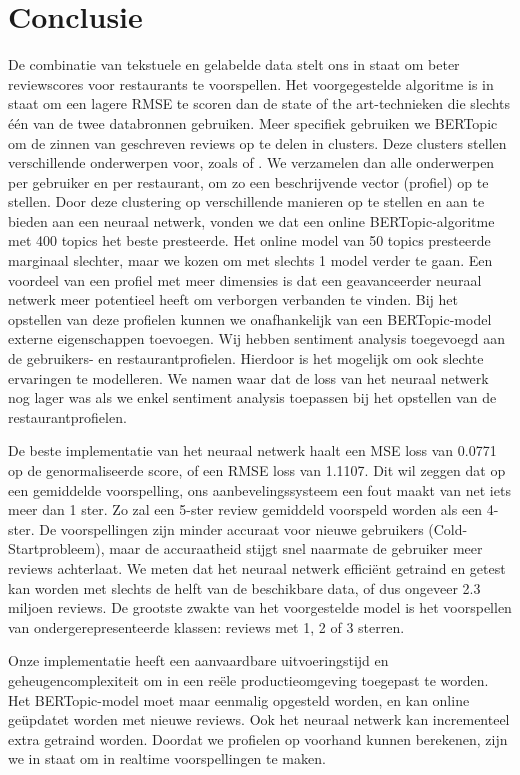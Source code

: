 \chapter{Conclusie}

De combinatie van tekstuele en gelabelde data stelt ons in staat om beter reviewscores voor restaurants te voorspellen. Het voorgegestelde algoritme is in staat om een lagere RMSE te scoren dan de state of the art-technieken die slechts één van de twee databronnen gebruiken. Meer specifiek gebruiken we BERTopic om de zinnen van geschreven reviews op te delen in clusters. Deze clusters stellen verschillende onderwerpen voor, zoals  of . We verzamelen dan alle onderwerpen per gebruiker en per restaurant, om zo een beschrijvende vector (profiel) op te stellen. Door deze clustering op verschillende manieren op te stellen en aan te bieden aan een neuraal netwerk, vonden we dat een online BERTopic-algoritme met 400 topics het beste presteerde. Het online model van 50 topics presteerde marginaal slechter, maar we kozen om met slechts 1 model verder te gaan. Een voordeel van een profiel met meer dimensies is dat een geavanceerder neuraal netwerk meer potentieel heeft om verborgen verbanden te vinden. Bij het opstellen van deze profielen kunnen we onafhankelijk van een BERTopic-model externe eigenschappen toevoegen. Wij hebben sentiment analysis toegevoegd aan de gebruikers- en restaurantprofielen. Hierdoor is het mogelijk om ook slechte ervaringen te modelleren. We namen waar dat de loss van het neuraal netwerk nog lager was als we enkel sentiment analysis toepassen bij het opstellen van de restaurantprofielen.

De beste implementatie van het neuraal netwerk haalt een MSE loss van 0.0771 op de genormaliseerde score, of een RMSE loss van 1.1107. Dit wil zeggen dat op een gemiddelde voorspelling, ons aanbevelingssysteem een fout maakt van net iets meer dan 1 ster. Zo zal een 5-ster review gemiddeld voorspeld worden als een 4-ster. De voorspellingen zijn minder accuraat voor nieuwe gebruikers (Cold-Startprobleem), maar de accuraatheid stijgt snel naarmate de gebruiker meer reviews achterlaat. We meten dat het neuraal netwerk efficiënt getraind en getest kan worden met slechts de helft van de beschikbare data, of dus ongeveer 2.3 miljoen reviews. De grootste zwakte van het voorgestelde model is het voorspellen van ondergerepresenteerde klassen: reviews met 1, 2 of 3 sterren.

Onze implementatie heeft een aanvaardbare uitvoeringstijd en geheugencomplexiteit om in een reële productieomgeving toegepast te worden. Het BERTopic-model moet maar eenmalig opgesteld worden, en kan online geüpdatet worden met nieuwe reviews. Ook het neuraal netwerk kan incrementeel extra getraind worden. Doordat we profielen op voorhand kunnen berekenen, zijn we in staat om in realtime voorspellingen te maken.

